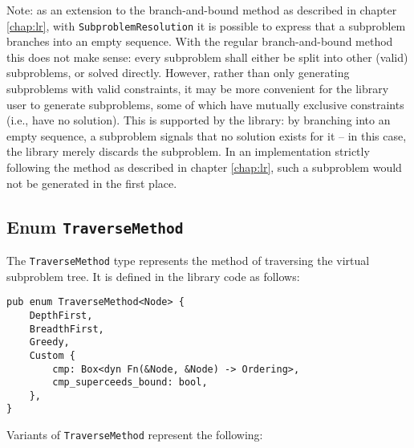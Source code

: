 Note: as an extension to the branch-and-bound method as described in chapter \ref{chap:lr},
with \texttt{SubproblemResolution} it is possible to express that a subproblem branches
into an empty sequence. With the regular branch-and-bound method this does not make sense:
every subproblem shall either be split into other (valid) subproblems, or solved directly.
However, rather than only generating subproblems with valid constraints, it may be more
convenient for the library user to generate subproblems, some of which have mutually exclusive
constraints (i.e., have no solution). This is supported by the library:
by branching into an empty sequence, a subproblem signals that no solution exists for it --
in this case, the library merely discards the subproblem. In an implementation strictly
following the method as described in chapter \ref{chap:lr}, such a subproblem would not be
generated in the first place.

\subsection{Enum \texttt{TraverseMethod}}

The \texttt{TraverseMethod} type represents the method of traversing the virtual subproblem
tree. It is defined in the library code as follows:

\begin{lstlisting}[caption=Enum \texttt{TraverseMethod}]
pub enum TraverseMethod<Node> {
    DepthFirst,
    BreadthFirst,
    Greedy,
    Custom {
        cmp: Box<dyn Fn(&Node, &Node) -> Ordering>,
        cmp_superceeds_bound: bool,
    },
}
\end{lstlisting}

Variants of \texttt{TraverseMethod} represent the following:

